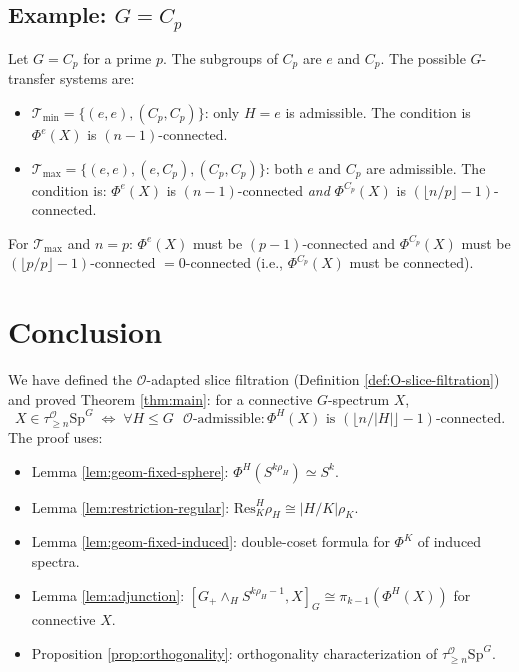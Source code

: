 \documentclass[12pt]{article}
\theoremstyle{definition}
\newcommand{\calO}{\mathcal{O}}
\newcommand{\SpG}{\mathrm{Sp}^G}
\newcommand{\floor}[1]{\lfloor #1 \rfloor}
\begin{document}
\subsection{Example: \texorpdfstring{$G = C_p$}{G = Cp}}

Let $G = C_p$ for a prime $p$. The subgroups of $C_p$ are $e$ and $C_p$. The possible
$G$-transfer systems are:
\begin{itemize}
\item $\mathcal{T}_{\min} = \{(e,e),(C_p, C_p)\}$: only $H = e$ is admissible. The condition
  is $\Phi^e(X)$ is $(n-1)$-connected.
\item $\mathcal{T}_{\max} = \{(e,e),(e,C_p),(C_p,C_p)\}$: both $e$ and $C_p$ are admissible.
  The condition is: $\Phi^e(X)$ is $(n-1)$-connected \emph{and} $\Phi^{C_p}(X)$ is
  $(\floor{n/p}-1)$-connected.
\end{itemize}
For $\mathcal{T}_{\max}$ and $n = p$: $\Phi^e(X)$ must be $(p-1)$-connected and $\Phi^{C_p}(X)$
must be $(\floor{p/p}-1)$-connected $= 0$-connected (i.e., $\Phi^{C_p}(X)$ must be connected).

\section{Conclusion}

We have defined the $\calO$-adapted slice filtration (Definition \ref{def:O-slice-filtration})
and proved Theorem \ref{thm:main}: for a connective $G$-spectrum $X$,
\[
  X \in \tau_{\geq n}^{\calO}\SpG \;\iff\;
  \forall H \leq G \text{ $\calO$-admissible}: \Phi^H(X) \text{ is }
  (\floor{n/|H|}-1)\text{-connected.}
\]
The proof uses:
\begin{itemize}
\item Lemma \ref{lem:geom-fixed-sphere}: $\Phi^H(S^{k\rho_H}) \simeq S^k$.
\item Lemma \ref{lem:restriction-regular}: $\mathrm{Res}^H_K\rho_H \cong |H/K|\rho_K$.
\item Lemma \ref{lem:geom-fixed-induced}: double-coset formula for $\Phi^K$ of induced spectra.
\item Lemma \ref{lem:adjunction}: $[G_+ \wedge_H S^{k\rho_H-1}, X]_G \cong \pi_{k-1}(\Phi^H(X))$
  for connective $X$.
\item Proposition \ref{prop:orthogonality}: orthogonality characterization of
  $\tau_{\geq n}^{\calO}\SpG$.
\end{itemize}
\end{document}
